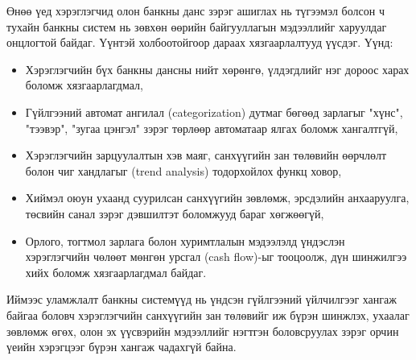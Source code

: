 Өнөө үед хэрэглэгчид олон банкны данс зэрэг ашиглах нь түгээмэл болсон ч тухайн банкны систем нь зөвхөн өөрийн байгууллагын мэдээллийг харуулдаг онцлогтой байдаг. Үүнтэй холбоотойгоор дараах хязгаарлалтууд үүсдэг. Үүнд:
\begin{itemize}
    \item [•] Хэрэглэгчийн бүх банкны дансны нийт хөрөнгө, үлдэгдлийг нэг дороос харах боломж хязгаарлагдмал,
    \item [•] Гүйлгээний автомат ангилал (categorization) дутмаг бөгөөд зарлагыг "хүнс", "тээвэр", "зугаа цэнгэл" зэрэг төрлөөр автоматаар ялгах боломж хангалтгүй,
    \item [•] Хэрэглэгчийн зарцуулалтын хэв маяг, санхүүгийн зан төлөвийн өөрчлөлт болон чиг хандлагыг (trend analysis) тодорхойлох функц ховор,
    \item [•] Хиймэл оюун ухаанд суурилсан санхүүгийн зөвлөмж, эрсдэлийн анхааруулга, төсвийн санал зэрэг дэвшилтэт боломжууд бараг хөгжөөгүй,
    \item [•] Орлого, тогтмол зарлага болон хуримтлалын мэдээлэлд үндэслэн хэрэглэгчийн чөлөөт мөнгөн урсгал (cash flow)-ыг тооцоолж, дүн шинжилгээ хийх боломж хязгаарлагдмал байдаг.
\end{itemize}

Иймээс уламжлалт банкны системүүд нь үндсэн гүйлгээний үйлчилгээг хангаж байгаа боловч хэрэглэгчийн санхүүгийн зан төлөвийг иж бүрэн шинжлэх, ухаалаг зөвлөмж өгөх, олон эх үүсвэрийн мэдээллийг нэгтгэн боловсруулах зэрэг орчин үеийн хэрэгцээг бүрэн хангаж чадахгүй байна.

